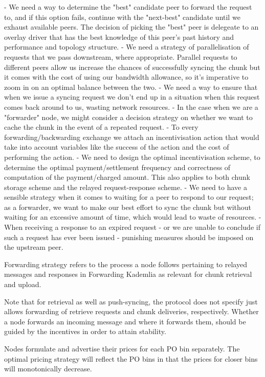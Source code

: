 - We need a way to determine the "best" candidate peer to forward the request to, and if this option fails, continue with the "next-best" candidate until we exhaust available peers. The decision of picking the "best" peer is delegeate to an overlay driver that has the best knowledge of this peer's past history and performance and topology structure.
- We need a strategy of parallelisation of requests that we pass downstream, where appropriate. Parallel requests to different peers allow us increase the chances of successfully syncing the chunk but it comes with the cost of using our bandwidth allowance, so it's imperative to zoom in on an optimal balance between the two.
- We need a way to ensure that when we issue a syncing request we don’t end up in a situation when this request comes back around to us, wasting network resources.
- In the case when we are a "forwarder" node, we might consider a decision strategy on whether we want to cache the chunk in the event of a repeated request.
- To every forwarding/backwarding exchange we attach an incentivisation action that would take into account variables like the success of the action and the cost of performing the action.
- We need to design the optimal incentivisation scheme, to determine the optimal payment/settlement frequency and correctness of computation of the payment/charged amount. This also applies to both chunk storage scheme and the relayed request-response scheme.
- We need to have a sensible strategy when it comes to waiting for a peer to respond to our request; as a forwarder, we want to make our best effort to sync the chunk but without waiting for an excessive amount of time, which would lead to waste of resources.
- When receiving a response to an expired request - or we are unable to conclude if such a request has ever been issued - punishing measures should be imposed on the upstream peer.


Forwarding strategy refers to the process a node follows pertaining to relayed messages and responses in Forwarding Kademlia as relevant for chunk retrieval and upload.

Note that for retrieval as well as push-syncing, the protocol does not specify just allows forwarding of retrieve requests and chunk deliveries, respectively.
Whether a node forwards an incoming message and where it forwards them, should be guided by the incentives in order to attain stability.

Nodes  formulate and  advertise their prices for each PO bin separately. 
The optimal pricing strategy will reflect the PO bins in that the prices for closer bins will monotonically decrease. 

